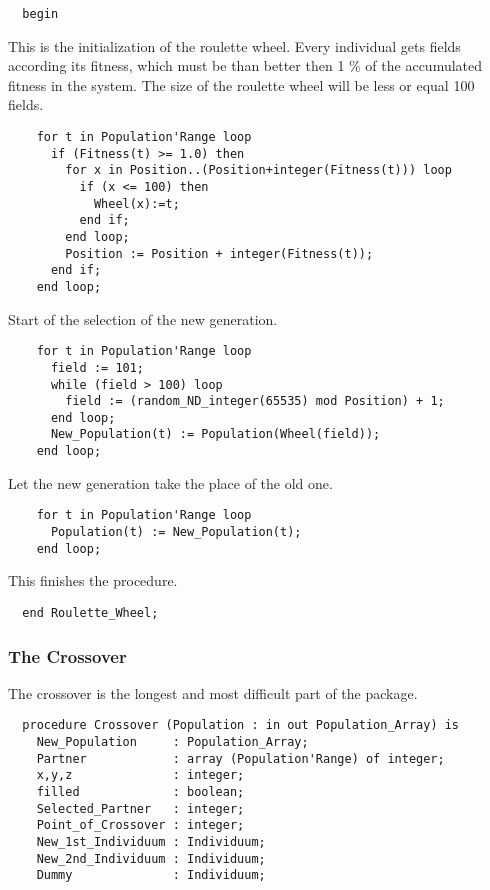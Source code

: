\begin{enumerate}
\begin{verbatim}
  begin
\end{verbatim}
This is the initialization of the roulette wheel. Every individual gets
fields according its fitness, which must be than better then 1 \% of the accumulated
fitness in the system. The size of the roulette wheel will be less or equal
100 fields.
\begin{verbatim}
    for t in Population'Range loop
      if (Fitness(t) >= 1.0) then
        for x in Position..(Position+integer(Fitness(t))) loop
          if (x <= 100) then
            Wheel(x):=t;
          end if;
        end loop;
        Position := Position + integer(Fitness(t));
      end if;
    end loop;
\end{verbatim}
Start of the selection of the new generation.
\begin{verbatim}
    for t in Population'Range loop
      field := 101;
      while (field > 100) loop
        field := (random_ND_integer(65535) mod Position) + 1;
      end loop;
      New_Population(t) := Population(Wheel(field));
    end loop;
\end{verbatim}
Let the new generation take the place of the old one.
\begin{verbatim}
    for t in Population'Range loop
      Population(t) := New_Population(t);
    end loop;
\end{verbatim}
This finishes the procedure.
\begin{verbatim}
  end Roulette_Wheel;
\end{verbatim}
\subsubsection{The Crossover}
The crossover is the longest and most difficult part of the package.
\begin{verbatim}
  procedure Crossover (Population : in out Population_Array) is
    New_Population     : Population_Array;
    Partner            : array (Population'Range) of integer;
    x,y,z              : integer;
    filled             : boolean;
    Selected_Partner   : integer;
    Point_of_Crossover : integer;
    New_1st_Individuum : Individuum;
    New_2nd_Individuum : Individuum;
    Dummy              : Individuum;


\end{verbatim}
\end{enumerate}

